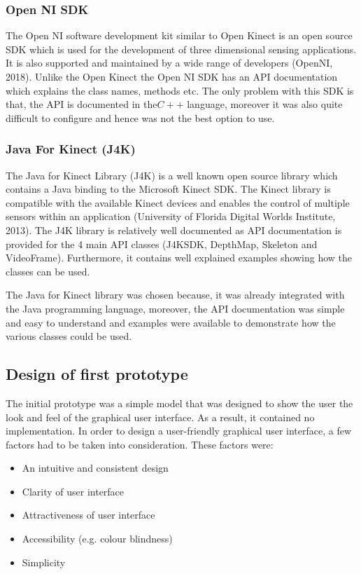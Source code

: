 \documentclass[a4paper, 12pt]{article}
\begin{document}
\subsubsection{Open NI SDK}

The Open NI software development kit similar to Open Kinect is an open source SDK which is used for the development of three dimensional sensing applications. It is also supported and maintained by a wide range of developers (OpenNI, 2018). Unlike the Open Kinect the Open NI SDK has an API documentation which explains the class names, methods etc. The only problem with this SDK is that, the API is documented in the$C++$ language, moreover it was also quite difficult to configure and hence was not the best option to use. 
 
\subsubsection{Java For Kinect (J4K)}
The Java for Kinect Library (J4K) is a well known open source library which contains a Java binding to the Microsoft Kinect SDK. The Kinect library is compatible with the available Kinect devices and enables the control of multiple sensors within an application (University of Florida Digital Worlds Institute, 2013). The J4K library is relatively well documented as API documentation is provided for the 4 main API classes (J4KSDK, DepthMap, Skeleton and VideoFrame). Furthermore, it contains well explained examples showing how the classes can be used. 

The Java for Kinect library was chosen because, it was already integrated with the Java programming language, moreover, the API documentation was simple and easy to understand and examples were available to demonstrate how the various classes could be used.

\subsection{Design of first prototype}
The initial prototype was a simple model that was designed to show the user the look and feel of the graphical user interface. As a result, it contained no implementation. In order to design a user-friendly graphical user interface,  a few factors had to be taken into consideration. These factors were: 

\begin{itemize}
	\item An intuitive and consistent design
	\item Clarity of user interface
	\item Attractiveness of user interface
	\item Accessibility (e.g. colour blindness) 
	\item Simplicity
\end{itemize}
\end{document}
